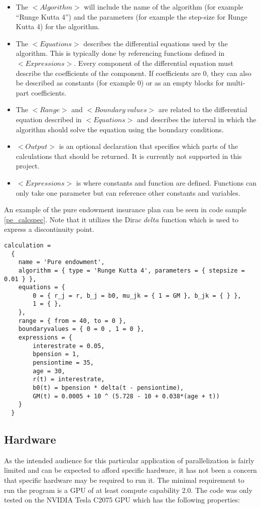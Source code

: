 {\begin{itemize}
\item The $<Algorithm>$ will include the name of the algorithm (for example ``Runge Kutta 4'') and the parameters (for example the step-size for Runge Kutta 4) for the algorithm.
\item The $<Equations>$ describes the differential equations used by the algorithm. This is typically done by referencing functions defined in $<Expressions>$. Every component of the differential equation must describe the coefficients of the component. If coefficients are 0, they can also be described as constants (for example 0) or as an empty blocks for multi-part coefficients.
\item The $<Range>$ and $<Boundary\ values>$ are related to the differential equation described in $<Equations>$ and describes the interval in which the algorithm should solve the equation using the boundary conditions.
\item $<Output>$ is an optional declaration that specifies which parts of the calculations that should be returned. It is currently not supported in this project. %
\item $<Expressions>$ is where constants and function are defined. Functions can only take one parameter but can reference other constants and variables.
\end{itemize}

An example of the pure endowment insurance plan can be seen in code sample \ref{pe_calcspec}. 
Note that it utilizes the Dirac $delta$ function which is used to express a discontinuity point.%

\begin{lstlisting}[caption=The pure endowment insurance plan expressed in CalcSpec, label=pe_calcspec]
calculation = 
  {
    name = 'Pure endowment',
    algorithm = { type = 'Runge Kutta 4', parameters = { stepsize = 0.01 } },
    equations = { 
        0 = { r_j = r, b_j = b0, mu_jk = { 1 = GM }, b_jk = { } },
        1 = { },
    },
    range = { from = 40, to = 0 },
    boundaryvalues = { 0 = 0 , 1 = 0 },
    expressions = {
        interestrate = 0.05,
        bpension = 1,
        pensiontime = 35,
        age = 30,
        r(t) = interestrate,
        b0(t) = bpension * delta(t - pensiontime),
        GM(t) = 0.0005 + 10 ^ (5.728 - 10 + 0.038*(age + t))
    }
  }
\end{lstlisting}

\subsection{Hardware}
As the intended audience for this particular application of parallelization is fairly limited and can be expected to afford specific hardware, it has not been a concern that specific hardware may be required to run it.
The minimal requirement to run the program is a GPU of at least compute capability 2.0.
The code was only tested on the NVIDIA Tesla C2075 GPU which has the following properties:

}
